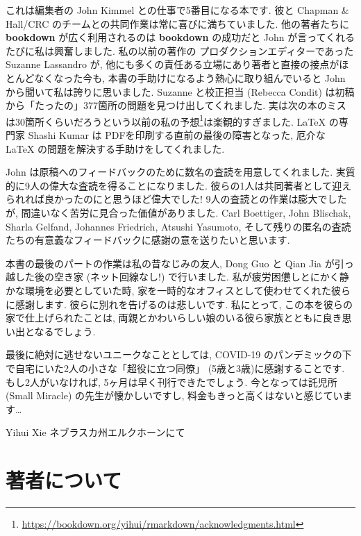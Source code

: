 \documentclass[
  11pt,
  lualatex,
  ja=standard]{bxjsreport}
\renewcommand{\href}[2]{#2\footnote{\url{#1}}}
\begin{document}
これは編集者の John Kimmel との仕事で5番目になる本です. 彼と Chapman \& Hall/CRC のチームとの共同作業は常に喜びに満ちていました. 他の著者たちに \textbf{bookdown} が広く利用されるのは \textbf{bookdown} の成功だと John が言ってくれるたびに私は興奮しました. 私の以前の著作の プロダクションエディターであった Suzanne Lassandro が, 他にも多くの責任ある立場にあり著者と直接の接点がほとんどなくなった今も, 本書の手助けになるよう熱心に取り組んでいると John から聞いて私は誇りに思いました. Suzanne と校正担当 (Rebecca Condit) は初稿から「たったの」377箇所の問題を見つけ出してくれました. 実は次の本のミスは30箇所くらいだろうという\href{https://bookdown.org/yihui/rmarkdown/acknowledgments.html}{以前の私の予想}は楽観的すぎました. LaTeX の専門家 Shashi Kumar は PDFを印刷する直前の最後の障害となった, 厄介な LaTeX の問題を解決する手助けをしてくれました.

John は原稿へのフィードバックのために数名の査読を用意してくれました. 実質的に9人の偉大な査読を得ることになりました. 彼らの1人は共同著者として迎えられれば良かったのにと思うほど偉大でした! 9人の査読との作業は膨大でしたが, 間違いなく苦労に見合った価値がありました. Carl Boettiger, John Blischak, Sharla Gelfand, Johannes Friedrich, Atsushi Yasumoto, そして残りの匿名の査読たちの有意義なフィードバックに感謝の意を送りたいと思います.

本書の最後のパートの作業は私の昔なじみの友人, Dong Guo と Qian Jia が引っ越した後の空き家 (ネット回線なし!) で行いました. 私が疲労困憊しとにかく静かな環境を必要としていた時, 家を一時的なオフィスとして使わせてくれた彼らに感謝します. 彼らに別れを告げるのは悲しいです. 私にとって, この本を彼らの家で仕上げられたことは, 両親とかわいらしい娘のいる彼ら家族とともに良き思い出となるでしょう.

最後に絶対に逃せないユニークなこととしては, COVID-19 のパンデミックの下で自宅にいた2人の小さな「超役に立つ同僚」 (5歳と3歳)に感謝することです. もし2人がいなければ, 5ヶ月は早く刊行できたでしょう. 今となっては託児所 (Small Miracle) の先生が懐かしいですし, 料金もきっと高くはないと感じています\ldots{}

\begin{flushright}
Yihui Xie ネブラスカ州エルクホーンにて

\end{flushright}

\hypertarget{author}{%
\chapter*{著者について}\label{author}}
\end{document}
